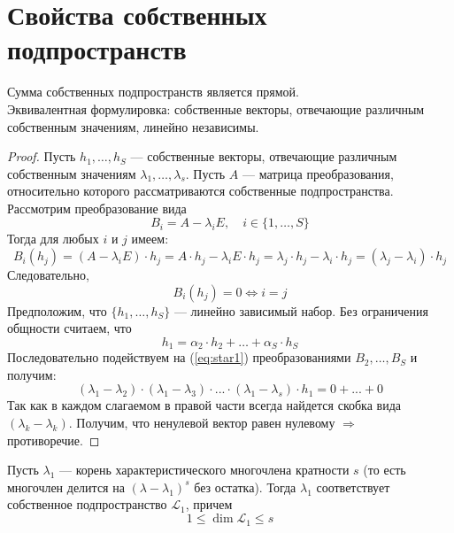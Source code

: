 \documentclass[11pt]{article}
\begin{document}
\section{Свойства собственных подпространств}

\begin{theorem}
    Сумма собственных подпространств является прямой. \\ Эквивалентная формулировка:
    собственные векторы, отвечающие различным собственным значениям, линейно независимы.
\end{theorem}

\begin{proof}
    Пусть $h_1, \dots, h_S$ --- собственные векторы, отвечающие различным собственным 
    значениям $\lambda_1, \dots, \lambda_s$. Пусть $A$ --- матрица преобразования,
    относительно которого рассматриваются собственные подпространства. Рассмотрим 
    преобразование вида \[B_i = A - \lambda_i E, \quad i \in \{1, \dots, S\}\]
    Тогда для любых $i$ и $j$ имеем: \[B_i(h_j) = (A - \lambda_i E) \cdot h_j =
    A \cdot h_j - \lambda_i E \cdot h_j = \lambda_j \cdot h_j - \lambda_i \cdot h_j = 
    (\lambda_j - \lambda_i) \cdot h_j\] Следовательно, \[B_i(h_j) = 0 \Longleftrightarrow i = j\]
    Предположим, что $\{h_1, \dots, h_S\}$ --- линейно зависимый набор. Без ограничения 
    общности считаем, что \[h_1 = \alpha_2 \cdot h_2 + \dots + \alpha_S \cdot h_S \label{eq:star1} \tag{*}\]
    Последовательно подействуем на (\ref{eq:star1}) преобразованиями $B_2, \dots, B_S$
    и получим: \[(\lambda_1 - \lambda_2) \cdot (\lambda_1 - \lambda_3) \cdot ... \cdot 
    (\lambda_1 - \lambda_s) \cdot h_1 = 0 + ... + 0\]
    Так как в каждом слагаемом в правой части всегда найдется скобка вида $(\lambda_k - \lambda_k)$.
    Получим, что ненулевой вектор равен нулевому $\Longrightarrow$ противоречие.
\end{proof}

\begin{theorem}
    Пусть $\lambda_1$ --- корень характеристического многочлена кратности $s$ (то есть
    многочлен делится на $(\lambda - \lambda_1)^s$ без остатка). Тогда $\lambda_1$
    соответствует собственное подпространство $\mathcal{L}_1$, причем 
    \[1 \leq \dim \mathcal{L}_1 \leq s\]
\end{theorem}
\end{document}
